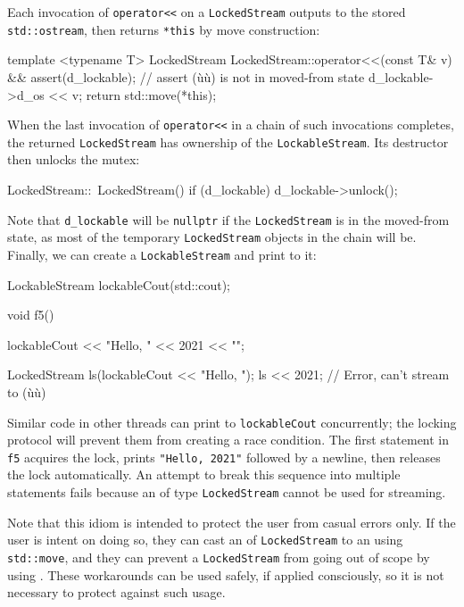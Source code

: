 Each invocation of \lstinline!operator<<! on a \lstinline!LockedStream!
outputs to the stored \lstinline!std::ostream!, then returns \lstinline!*this!
by move construction:

\begin{emcppslisting}
template <typename T>
LockedStream LockedStream::operator<<(const T& v) &&
{
    assert(d_lockable);  // assert (ù{}ù) is not in moved-from state
    d_lockable->d_os << v;
    return std::move(*this);
}
\end{emcppslisting}
    

\noindent When the last invocation of \lstinline!operator<<! in a chain of such
invocations completes, the returned \lstinline!LockedStream! has ownership
of the \lstinline!LockableStream!. Its destructor then unlocks the mutex:

\begin{emcppslisting}
LockedStream::~LockedStream()
{
    if (d_lockable)
    {
        d_lockable->unlock();
    }
}
\end{emcppslisting}
    

\noindent Note that \lstinline!d_lockable! will be \lstinline!nullptr! if the
\lstinline!LockedStream! is in the moved-from state, as most of the
temporary \lstinline!LockedStream! objects in the chain will be. Finally,
we can create a \lstinline!LockableStream! and print to it:

\begin{emcppslisting}
LockableStream lockableCout(std::cout);

void f5()
{
    lockableCout << "Hello, " << 2021 << "\n";

    LockedStream ls(lockableCout << "Hello, ");
    ls << 2021;  // Error, can't stream to (ù{}ù)
}
\end{emcppslisting}
    

\noindent Similar code in other threads can print to \lstinline!lockableCout!
concurrently; the locking protocol will prevent them from creating a
race condition. The first statement in \lstinline!f5! acquires the lock,
prints \lstinline!"Hello,!~\lstinline!2021"! followed by a newline, then
releases the lock automatically. An attempt to break this sequence into
multiple statements fails because an  of type
\lstinline!LockedStream! cannot be used for streaming.

Note that this idiom is intended to protect the user from casual errors
only. If the user is intent on doing so, they can cast an 
of \lstinline!LockedStream! to an  using \lstinline!std::move!,
and they can prevent a \lstinline!LockedStream! from going out of scope by
using . These workarounds can be used safely,
if applied consciously, so it is not necessary to protect against such
usage.

